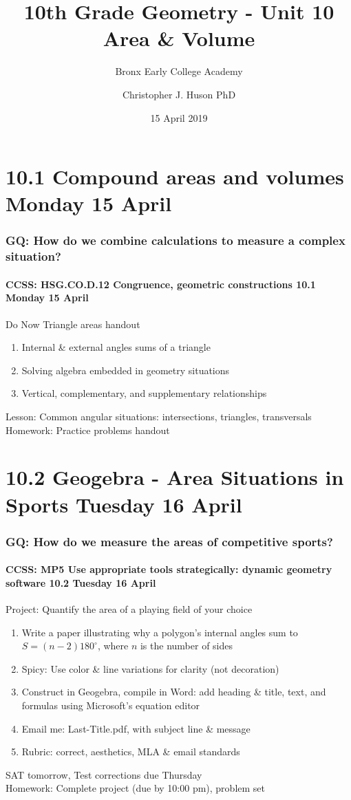 \documentclass{beamer}
\title{10th Grade Geometry - Unit 10 Area \& Volume}
\subtitle{Bronx Early College Academy}
\author{Christopher J. Huson PhD}
\date{15 April 2019}
\begin{document}
\frame{\titlepage}
\section[Outline]{}
\frame{\tableofcontents}


\section{10.1 Compound areas and volumes Monday 15 April}
  \frame
  {
    \frametitle{GQ: How do we combine calculations to measure a complex situation?}
    \framesubtitle{CCSS: HSG.CO.D.12 Congruence, geometric constructions \hfill \alert{10.1 Monday 15 April}}

    \begin{block}{Do Now Triangle areas handout}
      \begin{enumerate}
        \item Internal \& external angles sums of a triangle
        \item Solving algebra embedded in geometry situations
        \item Vertical, complementary, and supplementary relationships
      \end{enumerate}
    \end{block}
    Lesson: Common angular situations: intersections, triangles, transversals\\
    Homework: Practice problems handout
  }

\section{10.2 Geogebra - Area Situations in Sports Tuesday 16 April}
  \frame
  {
    \frametitle{GQ: How do we measure the areas of competitive sports?}
    \framesubtitle{CCSS: MP5 Use appropriate tools strategically: dynamic geometry software \hfill \alert{10.2 Tuesday 16 April}}

    \begin{block}{Project: Quantify the area of a playing field of your choice}
      \begin{enumerate}
        \item Write a paper illustrating why a polygon's internal angles sum to $S=(n-2)180^\circ$, where $n$ is the number of sides
        \item Spicy: Use color \& line variations for clarity (not decoration)
        \item Construct in Geogebra, compile in Word: add heading \& title, text, and formulas using Microsoft's equation editor
        \item Email me: Last-Title.pdf, with subject line \& message
        \item Rubric: correct, aesthetics, MLA \& email standards
      \end{enumerate}
    \end{block}
    SAT tomorrow, \alert{Test corrections due Thursday}\\
    Homework: Complete project (due by 10:00 pm), problem set
  }
\end{document}
